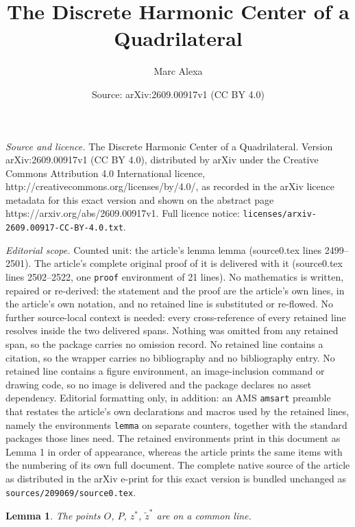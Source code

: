 \documentclass[10pt,a4paper]{amsart}
\title{The Discrete Harmonic Center of a Quadrilateral}
\author{Marc Alexa}
\date{Source: arXiv:2609.00917v1 (CC BY 4.0)}
\newtheorem{lemma}{Lemma}
\begin{document}
\maketitle

\noindent\emph{Source and licence.} The Discrete Harmonic Center of a Quadrilateral. Version arXiv:2609.00917v1 (CC BY 4.0), distributed by arXiv under the Creative Commons Attribution 4.0 International licence, http://creativecommons.org/licenses/by/4.0/, as recorded in the arXiv licence metadata for this exact version and shown on the abstract page https://arxiv.org/abs/2609.00917v1. Full licence notice: \texttt{licenses/arxiv-2609.00917-CC-BY-4.0.txt}.\par\smallskip

\noindent\textit{Editorial scope.} Counted unit: the article's lemma lemma (source0.tex lines 2499--2501). The article's complete original proof of it is delivered with it (source0.tex lines 2502--2522, one \texttt{proof} environment of 21 lines). No mathematics is written, repaired or re-derived: the statement and the proof are the article's own lines, in the article's own notation, and no retained line is substituted or re-flowed.  No further source-local context is needed: every cross-reference of every retained line resolves inside the two delivered spans.  Nothing was omitted from any retained span, so the package carries no omission record.  No retained line contains a citation, so the wrapper carries no bibliography and no bibliography entry.  No retained line contains a figure environment, an image-inclusion command or drawing code, so no image is delivered and the package declares no asset dependency.  Editorial formatting only, in addition: an AMS \texttt{amsart} preamble that restates the article's own declarations and macros used by the retained lines, namely the environments \texttt{lemma} on separate counters, together with the standard packages those lines need.  The retained environments print in this document as Lemma 1 in order of appearance, whereas the article prints the same items with the numbering of its own full document.  The complete native source of the article as distributed in the arXiv e-print for this exact version is bundled unchanged as \texttt{sources/209069/source0.tex}.
\begin{lemma}
    The points $O$, $P$, $z^*$, $\tilde{z}^*$ are on a common line. 
\end{lemma}
\end{document}
